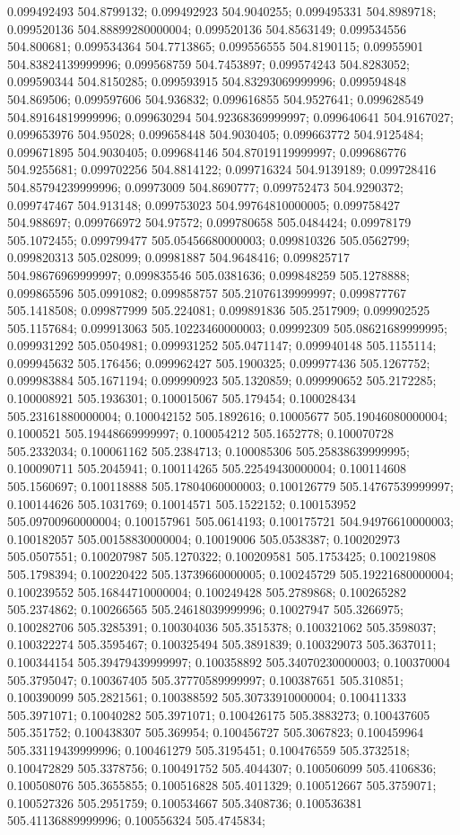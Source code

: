 0.099492493 504.8799132; 0.099492923 504.9040255; 0.099495331 504.8989718; 0.099520136 504.88899280000004; 0.099520136 504.8563149; 0.099534556 504.800681; 0.099534364 504.7713865; 0.099556555 504.8190115; 0.09955901 504.83824139999996; 0.099568759 504.7453897; 0.099574243 504.8283052; 0.099590344 504.8150285; 0.099593915 504.83293069999996; 0.099594848 504.869506; 0.099597606 504.936832; 0.099616855 504.9527641; 0.099628549 504.89164819999996; 0.099630294 504.92368369999997; 0.099640641 504.9167027; 0.099653976 504.95028; 0.099658448 504.9030405; 0.099663772 504.9125484; 0.099671895 504.9030405; 0.099684146 504.87019119999997; 0.099686776 504.9255681; 0.099702256 504.8814122; 0.099716324 504.9139189; 0.099728416 504.85794239999996; 0.09973009 504.8690777; 0.099752473 504.9290372; 0.099747467 504.913148; 0.099753023 504.99764810000005; 0.099758427 504.988697; 0.099766972 504.97572; 0.099780658 505.0484424; 0.09978179 505.1072455; 0.099799477 505.05456680000003; 0.099810326 505.0562799; 0.099820313 505.028099; 0.09981887 504.9648416; 0.099825717 504.98676969999997; 0.099835546 505.0381636; 0.099848259 505.1278888; 0.099865596 505.0991082; 0.099858757 505.21076139999997; 0.099877767 505.1418508; 0.099877999 505.224081; 0.099891836 505.2517909; 0.099902525 505.1157684; 0.099913063 505.10223460000003; 0.09992309 505.08621689999995; 0.099931292 505.0504981; 0.099931252 505.0471147; 0.099940148 505.1155114; 0.099945632 505.176456; 0.099962427 505.1900325; 0.099977436 505.1267752; 0.099983884 505.1671194; 0.099990923 505.1320859; 0.099990652 505.2172285; 0.100008921 505.1936301; 0.100015067 505.179454; 0.100028434 505.23161880000004; 0.100042152 505.1892616; 0.10005677 505.19046080000004; 0.1000521 505.19448669999997; 0.100054212 505.1652778; 0.100070728 505.2332034; 0.100061162 505.2384713; 0.100085306 505.25838639999995; 0.100090711 505.2045941; 0.100114265 505.22549430000004; 0.100114608 505.1560697; 0.100118888 505.17804060000003; 0.100126779 505.14767539999997; 0.100144626 505.1031769; 0.10014571 505.1522152; 0.100153952 505.09700960000004; 0.100157961 505.0614193; 0.100175721 504.94976610000003; 0.100182057 505.00158830000004; 0.10019006 505.0538387; 0.100202973 505.0507551; 0.100207987 505.1270322; 0.100209581 505.1753425; 0.100219808 505.1798394; 0.100220422 505.13739660000005; 0.100245729 505.19221680000004; 0.100239552 505.16844710000004; 0.100249428 505.2789868; 0.100265282 505.2374862; 0.100266565 505.24618039999996; 0.10027947 505.3266975; 0.100282706 505.3285391; 0.100304036 505.3515378; 0.100321062 505.3598037; 0.100322274 505.3595467; 0.100325494 505.3891839; 0.100329073 505.3637011; 0.100344154 505.39479439999997; 0.100358892 505.34070230000003; 0.100370004 505.3795047; 0.100367405 505.37770589999997; 0.100387651 505.310851; 0.100390099 505.2821561; 0.100388592 505.30733910000004; 0.100411333 505.3971071; 0.10040282 505.3971071; 0.100426175 505.3883273; 0.100437605 505.351752; 0.100438307 505.369954; 0.100456727 505.3067823; 0.100459964 505.33119439999996; 0.100461279 505.3195451; 0.100476559 505.3732518; 0.100472829 505.3378756; 0.100491752 505.4044307; 0.100506099 505.4106836; 0.100508076 505.3655855; 0.100516828 505.4011329; 0.100512667 505.3759071; 0.100527326 505.2951759; 0.100534667 505.3408736; 0.100536381 505.41136889999996; 0.100556324 505.4745834; 